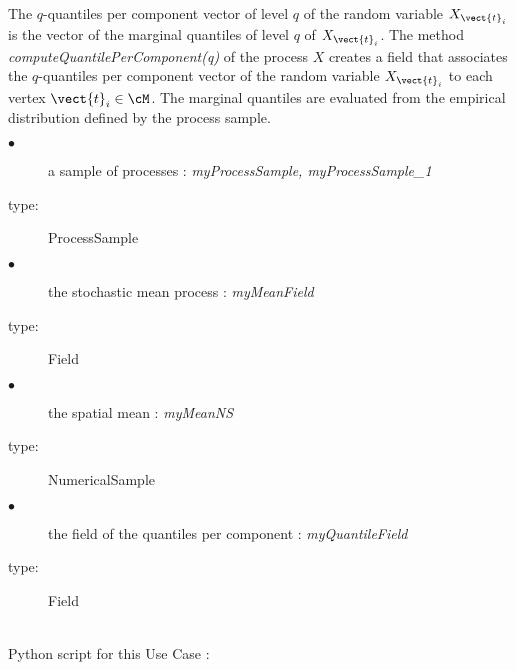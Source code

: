 The $q$-quantiles per component vector of level $q$ of the random variable $X_{\vect{t}_i}$ is the vector of the marginal quantiles  of level $q$  of  $X_{\vect{t}_i}$. The  method \emph{computeQuantilePerComponent(q)} of the process $X$ creates a field that associates   the $q$-quantiles per component vector of the random variable $X_{\vect{t}_i}$ to each vertex  $\vect{t}_i\in \cM$. The marginal quantiles are evaluated from the empirical distribution defined by the process sample.\\


{
  \begin{description}
  \item[$\bullet$] a sample of processes : {\itshape myProcessSample, myProcessSample\_1}
  \item[type:]  ProcessSample
  \end{description}

  \begin{description}
  \item[$\bullet$] the stochastic mean process : {\itshape myMeanField}
  \item[type:] Field
  \end{description}

  \begin{description}
  \item[$\bullet$] the spatial mean : {\itshape myMeanNS}
  \item[type:] NumericalSample
  \end{description}

  \begin{description}
  \item[$\bullet$] the field of the quantiles per component : {\itshape myQuantileField}
  \item[type:] Field
  \end{description}
}

\textspace\\
Python script for this Use Case :

